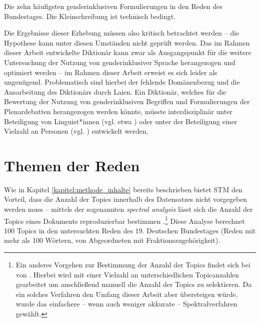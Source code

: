 \documentclass[12pt, 
    twoside=false, 
    bibliography=totoc, 
    numbers=endperiod, 
    headings=normal, 
    toc=chapterentrydotfill
    ]{scrbook}
\begin{document}
\begin{table}[htb]
    \centering
    \caption[Die zehn häufigsten genderinklusiven Formulierungen in den Reden des Bundestages]{Die zehn häufigsten genderinklusiven Formulierungen in den Reden des Bundestages. Die Kleinschreibung ist technisch bedingt.}
    
    \label{table:top_gender_phrasen}
\end{table}


Die Ergebnisse dieser Erhebung müssen also kritisch betrachtet werden -- die Hypothese kann unter diesen Umständen nicht geprüft werden. Das im Rahmen dieser Arbeit entwickelte Diktionär kann zwar als Ausgangspunkt für die weitere Untersuchung der Nutzung von genderinklusiver Sprache herangezogen und optimiert werden -- im Rahmen dieser Arbeit erweist es sich leider als ungenügend. Problematisch sind hierbei der fehlende Domänenbezug und die Ausarbeitung des Diktionärs durch Laien. Ein Diktionär, welches für die Bewertung der Nutzung von genderinklusiven Begriffen und Formulierungen der Plenardebatten herangezogen werden könnte, müsste interdisziplinär unter Beteiligung von Linguist*innen (vgl. etwa \parencite{remus_sentiws_2010}) oder unter der Beteiligung einer Vielzahl an Personen (vgl. \parencite{haselmayer_2017}) entwickelt werden.


\section{Themen der Reden}\label{kapitel:auswertung_themen}

Wie in Kapitel \ref{kapitel:methode_inhalte} bereits beschrieben bietet STM den Vorteil, dass die Anzahl der Topics innerhalb des Datensatzes nicht vorgegeben werden muss -- mittels der sogenannten \emph{spectral analysis} lässt sich die Anzahl der Topics eines Dokuments reproduzierbar bestimmen \parencites[11]{roberts_2018}[30ff.]{roberts_2016}.\footnote{Ein anderes Vorgehen zur Bestimmung der Anzahl der Topics findet sich bei  von \textcite[6ff.]{roberts_2014}. Hierbei wird mit einer Vielzahl an unterschiedlichen Topicanzahlen gearbeitet um anschließend manuell die Anzahl der Topics zu selektieren. Da ein solches Verfahren den Umfang dieser Arbeit aber übersteigen würde, wurde das einfachere -- wenn auch weniger akkurate -- Spektralverfahren gewählt.} Diese Analyse berechnet 100 Topics in den untersuchten Reden des 19. Deutschen Bundestages (Reden mit mehr als 100 Wörtern, von Abgeordneten mit Fraktionszugehörigkeit).
\end{document}
